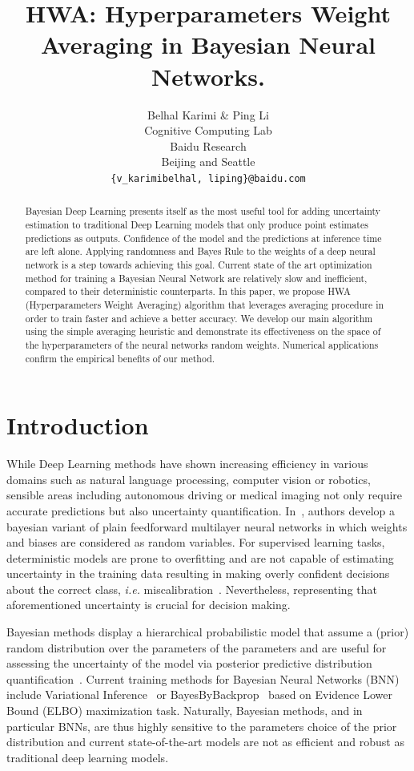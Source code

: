 \documentclass{article} %
\title{HWA: Hyperparameters Weight Averaging in Bayesian Neural Networks.}
\author{Belhal Karimi \& Ping Li \\
Cognitive Computing Lab\\
Baidu Research\\
Beijing and Seattle \\
\texttt{\{v_karimibelhal, liping\}@baidu.com} \\
}
\begin{document}
\maketitle

\begin{abstract}
Bayesian Deep Learning presents itself as the most useful tool for adding uncertainty estimation to traditional Deep Learning models that only produce point estimates predictions as outputs.
Confidence of the model and the predictions at inference time are left alone.
Applying randomness and Bayes Rule to the weights of a deep neural network is a step towards achieving this goal.
Current state of the art optimization method for training a Bayesian Neural Network are relatively slow and inefficient, compared to their deterministic counterparts.
In this paper, we propose HWA (Hyperparameters Weight Averaging) algorithm that leverages averaging procedure in order to train faster and achieve a better accuracy.
We develop our main algorithm using the simple averaging heuristic and demonstrate its effectiveness on the space of the hyperparameters of the neural networks random weights.
Numerical applications confirm the empirical benefits of our method.
\end{abstract}

\section{Introduction}
While Deep Learning methods have shown increasing efficiency in various domains such as natural language processing, computer vision or robotics, sensible areas including autonomous driving or medical imaging not only require accurate predictions but also uncertainty quantification.
In~\citep{neal2012bayesian}, authors develop a bayesian variant of plain feedforward multilayer neural networks in which weights and biases are considered as random variables.
For supervised learning tasks, deterministic models are prone to overfitting and are not capable of estimating uncertainty in the training data resulting in making overly confident decisions about the correct class, \textit{i.e.} miscalibration~\citep{guo2017calibration,kendall2017uncertainties}.
Nevertheless, representing that aforementioned uncertainty is crucial for decision making.

Bayesian methods display a hierarchical probabilistic model that assume a (prior) random distribution over the parameters of the parameters and are useful for assessing the uncertainty of the model via posterior predictive distribution quantification~\citep{blundell2015weight,kingma2015variational}.
Current training methods for Bayesian Neural Networks (BNN)~\citep{neal2012bayesian} include Variational Inference~\citep{graves2011practical, hoffman2013stochastic} or BayesByBackprop~\citep{blundell2015weight} based on Evidence Lower Bound (ELBO) maximization task.
Naturally, Bayesian methods, and in particular BNNs, are thus highly sensitive to the parameters choice of the prior distribution and current state-of-the-art models are not as efficient and robust as traditional deep learning models.
\end{document}
